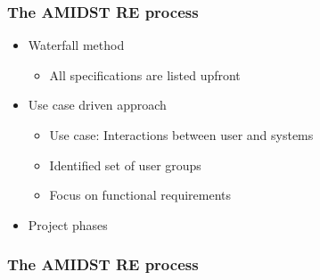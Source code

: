 \documentclass{beamer}
\begin{document}
\begin{frame} \frametitle{The AMIDST RE process} 
\vspace{-1cm}

\begin{itemize}
\item<1-> Waterfall method
\begin{itemize}
\item<1-> All specifications are listed upfront
\end{itemize}
\item<2-> Use case driven approach
\begin{itemize}
\item<2-> Use case: Interactions between user and systems
\item<2-> Identified set of user groups
\item<2-> Focus on functional requirements
\end{itemize}
\item<3-> Project phases
\end{itemize}

\end{frame}

\begin{frame} \frametitle{The AMIDST RE process} 
\vspace{-1cm}

\end{frame}
\end{document}
